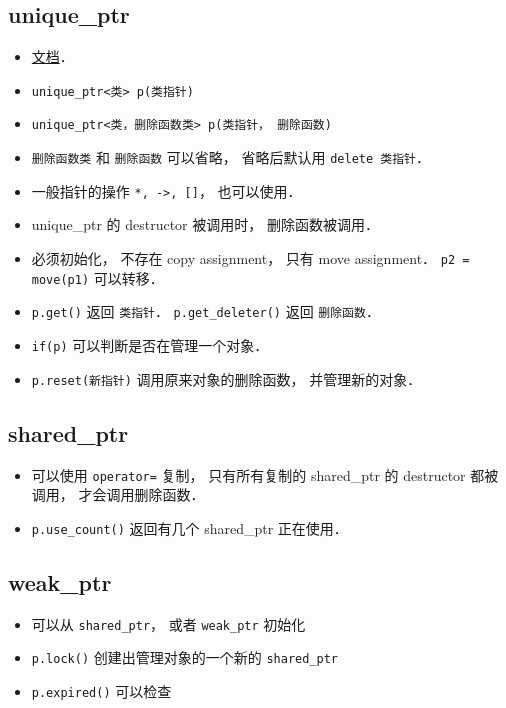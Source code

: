 
\begin{issues}
\issueDraft
\end{issues}

\subsection{unique_ptr}
\begin{itemize}
\item \href{https://en.cppreference.com/w/cpp/memory/unique_ptr}{文档}．
\item \verb|unique_ptr<类> p(类指针)|
\item \verb|unique_ptr<类，删除函数类> p(类指针， 删除函数)|
\item \verb|删除函数类| 和 \verb|删除函数| 可以省略， 省略后默认用 \verb|delete 类指针|．
\item 一般指针的操作 \verb|*, ->, []|， 也可以使用．
\item unique_ptr 的 destructor 被调用时， 删除函数被调用．
\item 必须初始化， 不存在 copy assignment， 只有 move assignment． \verb|p2 = move(p1)| 可以转移．
\item \verb|p.get()| 返回 \verb|类指针|． \verb|p.get_deleter()| 返回 \verb|删除函数|．
\item \verb|if(p)| 可以判断是否在管理一个对象．
\item \verb|p.reset(新指针)| 调用原来对象的删除函数， 并管理新的对象．
\end{itemize}

\subsection{shared_ptr}
\begin{itemize}
\item 可以使用 \verb|operator=| 复制， 只有所有复制的 shared_ptr 的 destructor 都被调用， 才会调用删除函数．
\item \verb|p.use_count()| 返回有几个 shared_ptr 正在使用．
\end{itemize}

\subsection{weak_ptr}
\begin{itemize}
\item 可以从 \verb|shared_ptr|， 或者 \verb|weak_ptr| 初始化
\item \verb|p.lock()| 创建出管理对象的一个新的 \verb|shared_ptr|
\item \verb|p.expired()| 可以检查 
\end{itemize}
